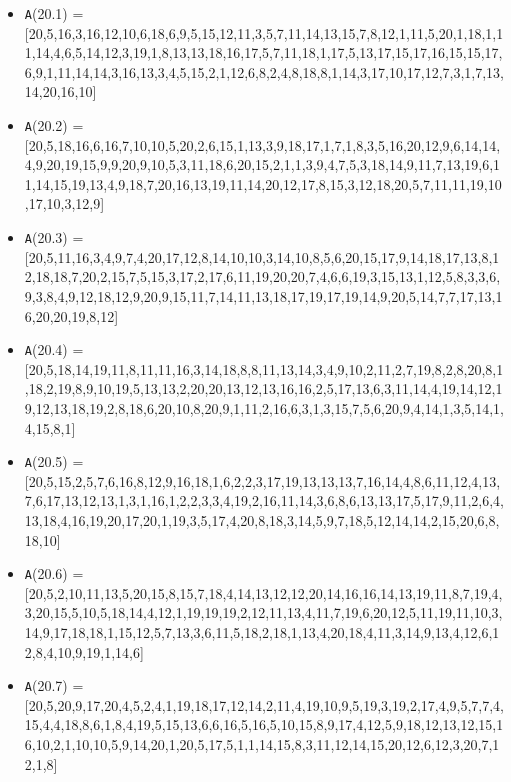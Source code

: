 \documentclass[runningheads,a4paper]{llncs}
\begin{document}
\begin{itemize}
	\item {\texttt A(20.1) = } [20,5,16,3,16,12,10,6,18,6,9,5,15,12,11,3,5,7,11,14,13,15,7,8,12,1,11,5,20,1,18,1,11,14,4,6,5,14,12,3,19,1,8,13,13,18,16,17,5,7,11,18,1,17,5,13,17,15,17,16,15,15,17,6,9,1,11,14,14,3,16,13,3,4,5,15,2,1,12,6,8,2,4,8,18,8,1,14,3,17,10,17,12,7,3,1,7,13,14,20,16,10]

	\item {\texttt A(20.2) = } [20,5,18,16,6,16,7,10,10,5,20,2,6,15,1,13,3,9,18,17,1,7,1,8,3,5,16,20,12,9,6,14,14,4,9,20,19,15,9,9,20,9,10,5,3,11,18,6,20,15,2,1,1,3,9,4,7,5,3,18,14,9,11,7,13,19,6,11,14,15,19,13,4,9,18,7,20,16,13,19,11,14,20,12,17,8,15,3,12,18,20,5,7,11,11,19,10,17,10,3,12,9]
	
	\item {\texttt A(20.3) = } [20,5,11,16,3,4,9,7,4,20,17,12,8,14,10,10,3,14,10,8,5,6,20,15,17,9,14,18,17,13,8,12,18,18,7,20,2,15,7,5,15,3,17,2,17,6,11,19,20,20,7,4,6,6,19,3,15,13,1,12,5,8,3,3,6,9,3,8,4,9,12,18,12,9,20,9,15,11,7,14,11,13,18,17,19,17,19,14,9,20,5,14,7,7,17,13,16,20,20,19,8,12]
	
	\item {\texttt A(20.4) = } [20,5,18,14,19,11,8,11,11,16,3,14,18,8,8,11,13,14,3,4,9,10,2,11,2,7,19,8,2,8,20,8,1,18,2,19,8,9,10,19,5,13,13,2,20,20,13,12,13,16,16,2,5,17,13,6,3,11,14,4,19,14,12,19,12,13,18,19,2,8,18,6,20,10,8,20,9,1,11,2,16,6,3,1,3,15,7,5,6,20,9,4,14,1,3,5,14,1,4,15,8,1]
	
	\item {\texttt A(20.5) = } [20,5,15,2,5,7,6,16,8,12,9,16,18,1,6,2,2,3,17,19,13,13,13,7,16,14,4,8,6,11,12,4,13,7,6,17,13,12,13,1,3,1,16,1,2,2,3,3,4,19,2,16,11,14,3,6,8,6,13,13,17,5,17,9,11,2,6,4,13,18,4,16,19,20,17,20,1,19,3,5,17,4,20,8,18,3,14,5,9,7,18,5,12,14,14,2,15,20,6,8,18,10]
	
	\item {\texttt A(20.6) = } [20,5,2,10,11,13,5,20,15,8,15,7,18,4,14,13,12,12,20,14,16,16,14,13,19,11,8,7,19,4,3,20,15,5,10,5,18,14,4,12,1,19,19,19,2,12,11,13,4,11,7,19,6,20,12,5,11,19,11,10,3,14,9,17,18,18,1,15,12,5,7,13,3,6,11,5,18,2,18,1,13,4,20,18,4,11,3,14,9,13,4,12,6,12,8,4,10,9,19,1,14,6]
	
	\item {\texttt A(20.7) = } [20,5,20,9,17,20,4,5,2,4,1,19,18,17,12,14,2,11,4,19,10,9,5,19,3,19,2,17,4,9,5,7,7,4,15,4,4,18,8,6,1,8,4,19,5,15,13,6,6,16,5,16,5,10,15,8,9,17,4,12,5,9,18,12,13,12,15,16,10,2,1,10,10,5,9,14,20,1,20,5,17,5,1,1,14,15,8,3,11,12,14,15,20,12,6,12,3,20,7,12,1,8]
	

\end{itemize}
\end{document}
